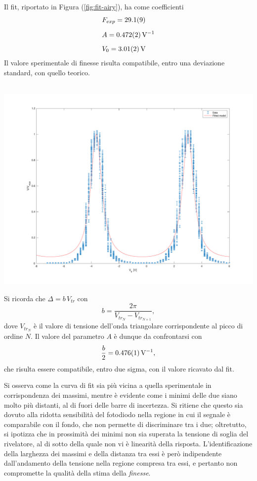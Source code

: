 \documentclass[10pt,oneside,a4paper]{article}
\newenvironment{Figure}
  {\par\medskip\noindent\minipage{\linewidth}}
  {\endminipage\par\medskip}
\begin{document}
\begin{multicols}{2}
Il fit, riportato in Figura (\ref{fig:fit-airy}), ha come coefficienti 
\begin{align*}
&F_{exp} = \SI{29.1\pm0.9}{}\\[0.2cm]
&A = \SI{0.472\pm0.002}{V^{-1}}\\[0.2cm]
&V_0 = \SI{3.01\pm0.02}{V}
\end{align*}
Il valore sperimentale di finesse risulta compatibile, entro una deviazione standard, con quello teorico. 

\begin{Figure}
	\begin{center}
	\hbox{\hspace{-0.8cm}
	\includegraphics[width=1.1\linewidth]{fit-airy}}
	\label{fig:fit-airy}
	\end{center}
\end{Figure}

Si ricorda che $\Delta = b\,V_{tr}$ con 
\[ \label{eq:b}
b = \frac{2\pi}{V_{tr_N}-V_{tr_{N+1}}},
\]
dove $V_{tr_N}$ è il valore di tensione dell'onda triangolare corrispondente al picco di ordine $N$. Il valore del parametro $A$ è dunque da confrontarsi con \[
\frac{b}{2} = \SI{0.476\pm0.001}{V^{-1}},
\]
che risulta essere compatibile, entro due sigma, con il valore ricavato dal fit.

Si osserva come la curva di fit sia più vicina a quella sperimentale in corrispondenza dei massimi, mentre è evidente come i minimi delle due siano molto più distanti, al di fuori delle barre di incertezza. Si ritiene che questo sia dovuto alla ridotta sensibilità del fotodiodo nella regione in cui il segnale è comparabile con il fondo, che non permette di discriminare tra i due; oltretutto, si ipotizza che in prossimità dei minimi non sia superata la tensione di soglia del rivelatore, al di sotto della quale non vi è linearità della risposta. L'identificazione della larghezza dei massimi e della distanza tra essi è però indipendente dall'andamento della tensione nella regione compresa tra essi, e pertanto non compromette la qualità della stima della \emph{finesse}.  



\end{multicols}
\end{document}

